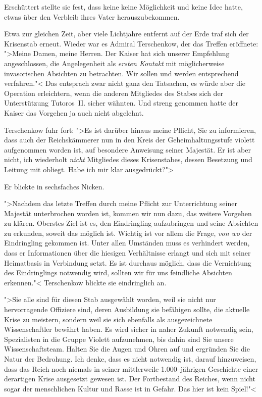 \documentclass[11pt,twoside,openany]{scrbook}
\begin{document}
Erschüttert stellte sie fest, dass keine keine Möglichkeit und keine Idee hatte, etwas über den Verbleib ihres Vater herauszubekommen.

\mbox{}

Etwa zur gleichen Zeit, aber viele Lichtjahre entfernt auf der Erde traf sich der Krisenstab erneut. Wieder war es Admiral Terschenkow, der das Treffen eröffnete: ">Meine Damen, meine Herren. Der Kaiser hat sich unserer Empfehlung angeschlossen, die Angelegenheit als \emph{ersten Kontakt} mit möglicherweise invasorischen Absichten zu betrachten. Wir sollen und werden entsprechend verfahren."< Das entsprach zwar nicht ganz den Tatsachen, es würde aber die Operation erleichtern, wenn die anderen Mitgliedes des Stabes sich der Unterstützung Tutoros~II. sicher wähnten. Und streng genommen hatte der Kaiser das Vorgehen ja auch nicht abgelehnt.

Terschenkow fuhr fort: ">Es ist darüber hinaus meine Pflicht, Sie zu informieren, dass auch der Reichskämmerer nun in den Kreis der Geheimhaltungsstufe violett aufgenommen worden ist, auf besondere Anweisung seiner Majestät. Er ist aber nicht, ich wiederholt \emph{nicht} Mitgliedes dieses Krisenstabes, dessen Besetzung und Leitung mit obliegt. Habe ich mir klar ausgedrückt?">

Er blickte in sechsfaches Nicken.

">Nachdem das letzte Treffen durch meine Pflicht zur Unterrichtung seiner Majestät unterbrochen worden ist, kommen wir nun dazu, das weitere Vorgehen zu klären. Oberstes Ziel ist es, den Eindringling aufzubringen und seine Absichten zu erkunden, soweit das möglich ist. Wichtig ist vor allem die Frage, \emph{von wo} der Eindringling gekommen ist. Unter allen Umständen muss es verhindert werden, dass er Informationen über die hiesigen Verhältnisse erlangt und sich mit seiner Heimatbasis in Verbindung setzt. Es ist durchaus möglich, dass die Vernichtung des Eindringlings notwendig wird, sollten wir für uns feindliche Absichten erkennen."< Terschenkow blickte sie eindringlich an.

">Sie alle sind für diesen Stab ausgewählt worden, weil sie nicht nur hervorragende Offiziere sind, deren Ausbildung sie befähigen sollte, die aktuelle Krise zu meistern, sondern weil sie sich ebenfalls als ausgezeichnete Wissenschaftler bewährt haben. Es wird sicher in naher Zukunft notwendig sein, Spezialisten in die Gruppe Violett aufzunehmen, bis dahin sind Sie unsere Wissenschaftsteam. Halten Sie die Augen und Ohren auf und ergründen Sie die Natur der Bedrohung. Ich denke, dass es nicht notwendig ist, darauf hinzuweisen, dass das Reich noch niemals in seiner mittlerweile 1.000--jährigen Geschichte einer derartigen Krise ausgesetzt gewesen ist. Der Fortbestand des Reiches, wenn nicht sogar der menschlichen Kultur und Rasse ist in Gefahr. Das hier ist kein Spiel!"<
\end{document}
